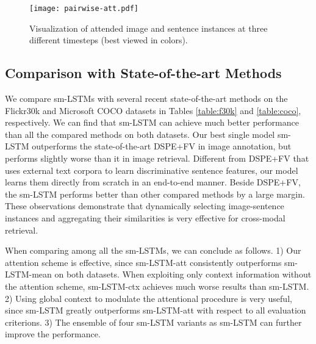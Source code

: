 \documentclass[10pt,twocolumn,letterpaper]{article}
\begin{document}
\begin{figure*}[t]
\begin{center}
\texttt{[image: pairwise-att.pdf]}
\end{center}
\caption{Visualization of attended image and sentence instances at three different timesteps (best
viewed in colors).}
\label{fig:pairwise}
\end{figure*}






\subsection{Comparison with State-of-the-art Methods}

We compare sm-LSTMs with several recent state-of-the-art methods
on the Flickr30k and Microsoft COCO datasets
in Tables \ref{table:f30k} and \ref{table:coco}, respectively.
We can find that sm-LSTM can achieve much better performance
than all the compared methods on both datasets.
Our best single model sm-LSTM outperforms the
state-of-the-art DSPE+FV in image annotation, but performs slightly worse
than it in image retrieval.
Different from DSPE+FV that uses external text corpora to learn discriminative sentence features, our model
learns them directly from scratch in an end-to-end manner.
Beside DSPE+FV, the sm-LSTM performs better than other compared methods by a large margin.
These observations demonstrate that dynamically selecting image-sentence instances and
aggregating their similarities is very effective for cross-modal retrieval.


When comparing among all the sm-LSTMs, we can conclude as follows.
1) Our attention scheme is effective,
since sm-LSTM-att consistently outperforms sm-LSTM-mean on both datasets.
When exploiting only context information without the attention scheme,
sm-LSTM-ctx achieves much worse results than sm-LSTM.
2) Using global context to modulate the attentional procedure
is very useful, since sm-LSTM greatly outperforms sm-LSTM-att
with respect to all evaluation criterions.
3) The ensemble of four sm-LSTM variants as sm-LSTM can further improve the performance.
\end{document}
